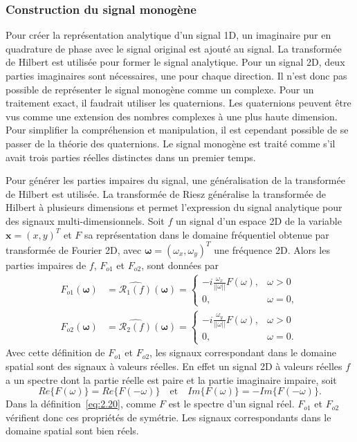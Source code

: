 \subsubsection{Construction du signal monogène}

Pour créer la représentation analytique d'un signal 1D, un imaginaire pur en quadrature de phase avec le signal original est ajouté au signal. La transformée de Hilbert est utilisée pour former le signal analytique. Pour un signal 2D, deux parties imaginaires sont nécessaires, une pour chaque direction. Il n'est donc pas possible de représenter le signal monogène comme un complexe. Pour un traitement exact, il faudrait utiliser les quaternions. Les quaternions peuvent être vus comme une extension des nombres complexes à une plus haute dimension. Pour simplifier la compréhension et manipulation, il est cependant possible de se passer de la théorie des quaternions. Le signal monogène est traité comme s'il avait trois parties réelles distinctes dans un premier temps.

\bigskip

Pour générer les parties impaires du signal, une généralisation de la transformée de Hilbert est utilisée. La transformée de Riesz généralise la transformée de Hilbert à plusieurs dimensions et permet l'expression du signal analytique pour des signaux multi-dimensionnels. Soit $f$ un signal d'un espace 2D de la variable $\mathbf{x} = (x, y)^T$ et $F$ sa représentation dans le domaine fréquentiel obtenue par transformée de Fourier 2D, avec $\mathbf{\omega}=(\omega_x, \omega_y)^T$ une fréquence 2D. Alors les parties impaires de $f$, $F_{o1}$ et $F_{o2}$, sont données par
\begin{align}
    F_{o1}(\mathbf{\omega}) &= \widehat{\mathcal{R}_1(f)}(\mathbf{\omega}) =
        \left\{
        \begin{array}{ll}
            -i\frac{\omega_x}{||\omega||}F(\omega), & \omega > 0 \\
            0, & \omega = 0,
        \end{array}
        \right. \\
    F_{o2}(\mathbf{\omega}) &= \widehat{\mathcal{R}_2(f)}(\mathbf{\omega}) =
        \left\{
        \begin{array}{ll}
            -i\frac{\omega_y}{||\omega||}F(\omega), & \omega > 0 \\
            0, & \omega = 0.
        \end{array}
        \right.
    \label{eq:2.20}
\end{align}
Avec cette définition de $F_{o1}$ et $F_{o2}$, les signaux correspondant dans le domaine spatial sont des signaux à valeurs réelles. En effet un signal 2D à valeurs réelles $f$ a un spectre dont la partie réelle est paire et la partie imaginaire impaire, soit
\begin{equation}
    Re\{F(\omega)\} = Re\{F(-\omega)\} \quad \text{et} \quad Im\{F(\omega)\} = -Im\{F(-\omega)\}.
\end{equation}
Dans la définition~\ref{eq:2.20}, comme $F$ est le spectre d'un signal réel. $F_{o1}$ et $F_{o2}$ vérifient donc ces propriétés de symétrie. Les signaux correspondants dans le domaine spatial sont bien réels.

